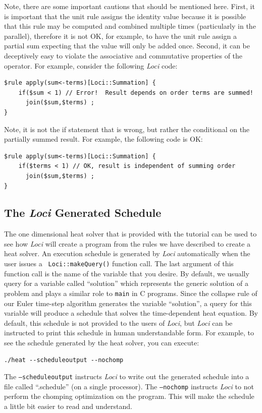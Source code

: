 \documentclass[10pt,epsf,letterpaper,twoside]{book}
\begin{document}
Note, there are some important cautions that should be mentioned
here.  First, it is important that the unit rule assigns the identity
value because it is possible that this rule may be computed and
combined multiple times (particularly in the parallel), therefore it
is not OK, for example, to have the unit rule assign a partial sum
expecting that the value will only be added once.  Second, it can be
deceptively easy to violate the associative and commutative properties
of the operator.  For example, consider the following {\it Loci} code:
\begin{verbatim}
$rule apply(sum<-terms)[Loci::Summation] {
    if($sum < 1) // Error!  Result depends on order terms are summed!
      join($sum,$terms) ; 
}
\end{verbatim}
Note, it is not the if statement that is wrong, but rather the
conditional on the partially summed result.  For example, the
following code is OK:
\begin{verbatim}
$rule apply(sum<-terms)[Loci::Summation] {
    if($terms < 1) // OK, result is independent of summing order
      join($sum,$terms) ; 
}
\end{verbatim}

\subsection{The {\it Loci} Generated Schedule}

The one dimensional heat solver that is provided with the tutorial can
be used to see how {\it Loci} will create a program from the rules we have
described to create a heat solver. An execution schedule is generated
by {\it Loci} automatically when the user issues a {\tt
  Loci::makeQuery()} function call.  The last argument of this
function call is the name of the variable that you desire.  By
default, we usually query for a variable called ``solution'' which
represents the generic solution of a problem and plays a similar role
to {\tt main} in C programs.  Since the collapse rule of our Euler
time-step algorithm generates the variable ``solution'', a query for
this variable will produce a schedule that solves the time-dependent
heat equation.  By default, this schedule is not provided to the users
of {\it Loci}, but {\it Loci} can be instructed to print this schedule
in human understandable form.  For example, to see the schedule
generated by the heat solver, you can execute:
\begin{verbatim}
./heat --scheduleoutput --nochomp
\end{verbatim}
The {\tt --scheduleoutput} instructs {\it Loci} to write out the
generated schedule into a file called ``.schedule'' (on a single
processor).  The {\tt --nochomp} instructs {\it Loci} to not perform
the chomping optimization on the program.  This will make the schedule
a little bit easier to read and understand.
\end{document}
